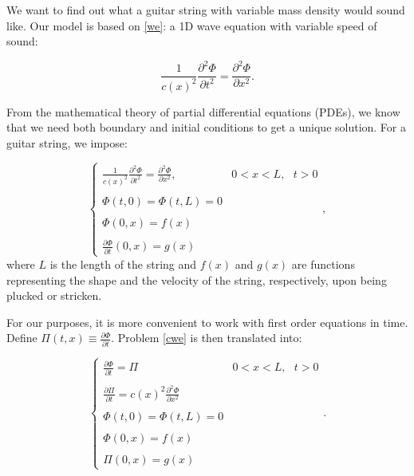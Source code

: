 \documentclass{article}
\begin{document}
We want to find out what a guitar string with variable mass density would sound like. Our model is based on \eqref{we}: a 1D wave equation with variable speed of sound:

\begin{equation}\label{we}
\boxed{\frac{1}{c(x)^2}\frac{\partial^2 \Phi}{\partial t^2}=\frac{\partial^2 \Phi}{\partial x^2}.}
\end{equation}

From the mathematical theory of partial differential equations (PDEs), we know that we need both boundary and initial conditions to get a unique solution. For a guitar string, we impose:

\begin{equation}\label{cwe}
\left\{\begin{array}{cc}
\displaystyle\frac{1}{c(x)^2}\frac{\partial^2 \Phi}{\partial t^2}=\frac{\partial^2 \Phi}{\partial x^2},&0<x<L,\text{ }t>0\\
\text{ }&\text{ }\\
\displaystyle \Phi(t,0)=\Phi(t,L)=0&\text{ }\\
\text{ }&\text{ }\\
\displaystyle\Phi(0,x)=f(x)&\text{ }\\
\text{ }&\text{ }\\
\displaystyle\frac{\partial \Phi}{\partial t}(0,x)=g(x)&\text{ }
\end{array}\right.,
\end{equation}
where $L$ is the length of the string and $f(x)$ and $g(x)$ are functions representing the shape and the velocity of the string, respectively, upon being plucked or stricken.

For our purposes, it is more convenient to work with first order equations in time. Define $\Pi(t,x)\equiv\displaystyle\frac{\partial \Phi}{\partial t}$. Problem \eqref{cwe} is then translated into:

\begin{equation}\label{cweII}
\left\{\begin{array}{cc}
\displaystyle\frac{\partial \Phi}{\partial t}=\Pi&0<x<L,\text{ }t>0\\
\text{ }&\text{ }\\
\displaystyle\frac{\partial \Pi}{\partial t}=c(x)^2\frac{\partial^2 \Phi}{\partial x^2}&\text{ }\\
\text{ }&\text{ }\\
\displaystyle \Phi(t,0)=\Phi(t,L)=0&\text{ }\\
\text{ }&\text{ }\\
\displaystyle\Phi(0,x)=f(x)&\text{ }\\
\text{ }&\text{ }\\
\displaystyle\Pi(0,x)=g(x)&\text{ }
\end{array}\right..
\end{equation}
\end{document}
